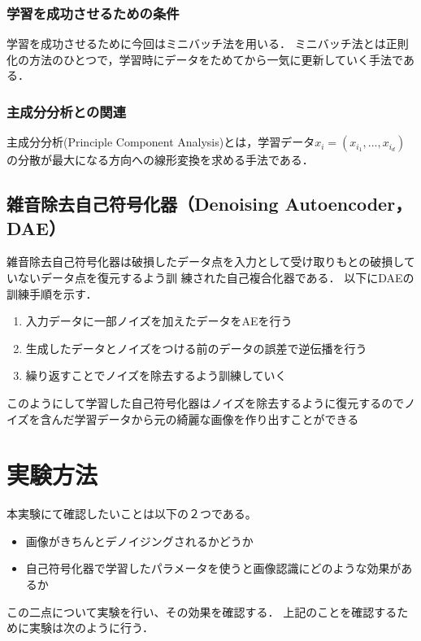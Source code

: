 \documentclass[12pt]{jsarticle}
\begin{document}
\subsubsection{学習を成功させるための条件}
学習を成功させるために今回はミニバッチ法を用いる．
ミニバッチ法とは正則化の方法のひとつで，学習時にデータをためてから一気に更新していく手法である．


\subsubsection{主成分分析との関連}
主成分分析(Principle Component Analysis)とは，学習データ$ x_i = (x_i_1,...,x_i_d ) $
の分散が最大になる方向への線形変換を求める手法である．


\subsection{雑音除去自己符号化器（Denoising Autoencoder，DAE）}

雑音除去自己符号化器は破損したデータ点を入力として受け取りもとの破損していないデータ点を復元するよう訓 練された自己複合化器である．
以下にDAEの訓練手順を示す．
\begin{enumerate}
  \item 入力データに一部ノイズを加えたデータをAEを行う
  \item 生成したデータとノイズをつける前のデータの誤差で逆伝播を行う
  \item 繰り返すことでノイズを除去するよう訓練していく
\end{enumerate}

このようにして学習した自己符号化器はノイズを除去するように復元するのでノイズを含んだ学習データから元の綺麗な画像を作り出すことができる

\section{実験方法}

本実験にて確認したいことは以下の２つである。

\begin{itemize}
  \item 画像がきちんとデノイジングされるかどうか
  \item 自己符号化器で学習したパラメータを使うと画像認識にどのような効果があるか
\end{itemize}

この二点について実験を行い、その効果を確認する．
上記のことを確認するために実験は次のように行う．
\end{document}
